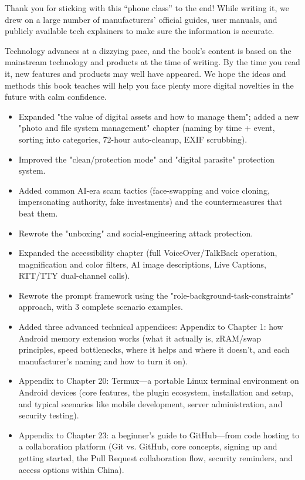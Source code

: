 
Thank you for sticking with this “phone class” to the end! While writing it, we drew on a large number of manufacturers' official guides, user manuals, and publicly available tech explainers to make sure the information is accurate.

Technology advances at a dizzying pace, and the book's content is based on the mainstream technology and products at the time of writing. By the time you read it, new features and products may well have appeared. We hope the ideas and methods this book teaches will help you face plenty more digital novelties in the future with calm confidence.


\begin{itemize}
  \item Expanded "the value of digital assets and how to manage them"; added a new "photo and file system management" chapter (naming by time + event, sorting into categories, 72-hour auto-cleanup, EXIF scrubbing).
  \item Improved the "clean/protection mode" and "digital parasite" protection system.
  \item Added common AI-era scam tactics (face-swapping and voice cloning, impersonating authority, fake investments) and the countermeasures that beat them.
  \item Rewrote the "unboxing" and social-engineering attack protection.
  \item Expanded the accessibility chapter (full VoiceOver/TalkBack operation, magnification and color filters, AI image descriptions, Live Captions, RTT/TTY dual-channel calls).
  \item Rewrote the prompt framework using the "role-background-task-constraints" approach, with 3 complete scenario examples.
  \item Added three advanced technical appendices: Appendix to Chapter 1: how Android memory extension works (what it actually is, zRAM/swap principles, speed bottlenecks, where it helps and where it doesn't, and each manufacturer's naming and how to turn it on).
  \item Appendix to Chapter 20: Termux—a portable Linux terminal environment on Android devices (core features, the plugin ecosystem, installation and setup, and typical scenarios like mobile development, server administration, and security testing).
  \item Appendix to Chapter 23: a beginner's guide to GitHub—from code hosting to a collaboration platform (Git vs. GitHub, core concepts, signing up and getting started, the Pull Request collaboration flow, security reminders, and access options within China).
\end{itemize}

